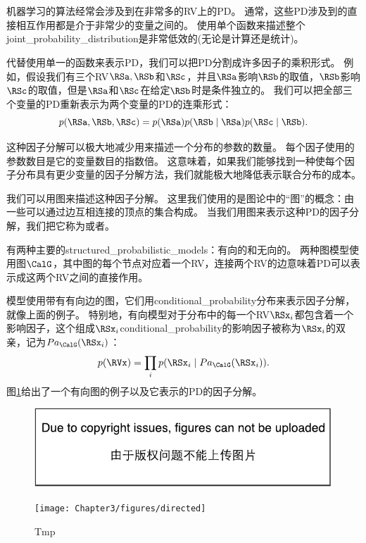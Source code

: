 
\section{}
\label{sec:structured_probabilistic_models_chap3}

机器学习的算法经常会涉及到在非常多的\gls{RV}上的\gls{PD}。
通常，这些\gls{PD}涉及到的直接相互作用都是介于非常少的变量之间的。
使用单个函数来描述整个\gls{joint_probability_distribution}是非常低效的(无论是计算还是统计)。

代替使用单一的函数来表示\gls{PD}，我们可以把\gls{PD}分割成许多因子的乘积形式。
例如，假设我们有三个\gls{RV}$\RSa, \RSb$和$\RSc$，并且$\RSa$影响$\RSb$的取值，$\RSb$影响$\RSc$的取值，但是$\RSa$和$\RSc$在给定$\RSb$时是条件独立的。
我们可以把全部三个变量的\gls{PD}重新表示为两个变量的\gls{PD}的连乘形式：
\begin{equation}
p(\RSa, \RSb, \RSc) = p(\RSa)p(\RSb\mid \RSa)p(\RSc\mid\RSb).
\end{equation}

这种因子分解可以极大地减少用来描述一个分布的参数的数量。
每个因子使用的参数数目是它的变量数目的指数倍。
这意味着，如果我们能够找到一种使每个因子分布具有更少变量的因子分解方法，我们就能极大地降低表示联合分布的成本。

我们可以用图来描述这种因子分解。
这里我们使用的是图论中的``图''的概念：由一些可以通过边互相连接的顶点的集合构成。
当我们用图来表示这种\gls{PD}的因子分解，我们把它称为或者。

有两种主要的\gls{structured_probabilistic_models}：有向的和无向的。
两种图模型使用图$\CalG$，其中图的每个节点对应着一个\gls{RV}，连接两个\gls{RV}的边意味着\gls{PD}可以表示成这两个\gls{RV}之间的直接作用。

模型使用带有有向边的图，它们用\gls{conditional_probability}分布来表示因子分解，就像上面的例子。
特别地，有向模型对于分布中的每一个\gls{RV}$\RSx_i$都包含着一个影响因子，这个组成$\RSx_i$\gls{conditional_probability}的影响因子被称为$\RSx_i$的双亲，记为$Pa_\CalG(\RSx_i)$：
\begin{equation}
p(\RVx) = \prod_i p(\RSx_i \mid Pa_\CalG(\RSx_i)).
\end{equation}
图\ref{fig:chap3_directed}给出了一个有向图的例子以及它表示的\gls{PD}的因子分解。
\begin{figure}[!htb]
\ifOpenSource
\centerline{\includegraphics{figure.pdf}}
\else
\centerline{\texttt{[image: Chapter3/figures/directed]}}
\fi
\caption{Tmp}
\label{fig:chap3_directed}
\end{figure}


